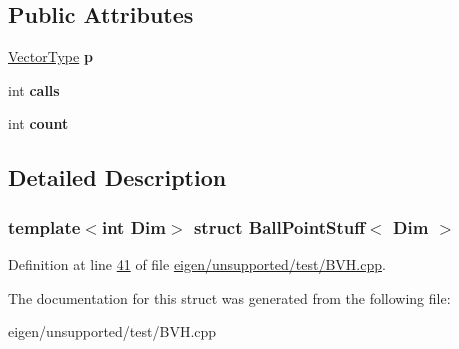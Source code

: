 \subsection*{Public Attributes}
\begin{DoxyCompactItemize}
\item 
\mbox{\label{struct_ball_point_stuff_a2c55234ade26f374bd39c2fe980ec314}} 
\hyperlink{struct_vector_type}{Vector\+Type} {\bfseries p}
\item 
\mbox{\label{struct_ball_point_stuff_a8f94a04329d9818f675514bede547f73}} 
int {\bfseries calls}
\item 
\mbox{\label{struct_ball_point_stuff_ae48b8d3fc0f3647022f8dc6ab0c5cfde}} 
int {\bfseries count}
\end{DoxyCompactItemize}


\subsection{Detailed Description}
\subsubsection*{template$<$int Dim$>$\newline
struct Ball\+Point\+Stuff$<$ Dim $>$}



Definition at line \hyperlink{eigen_2unsupported_2test_2_b_v_h_8cpp_source_l00041}{41} of file \hyperlink{eigen_2unsupported_2test_2_b_v_h_8cpp_source}{eigen/unsupported/test/\+B\+V\+H.\+cpp}.



The documentation for this struct was generated from the following file\+:\begin{DoxyCompactItemize}
\item 
eigen/unsupported/test/\+B\+V\+H.\+cpp\end{DoxyCompactItemize}
